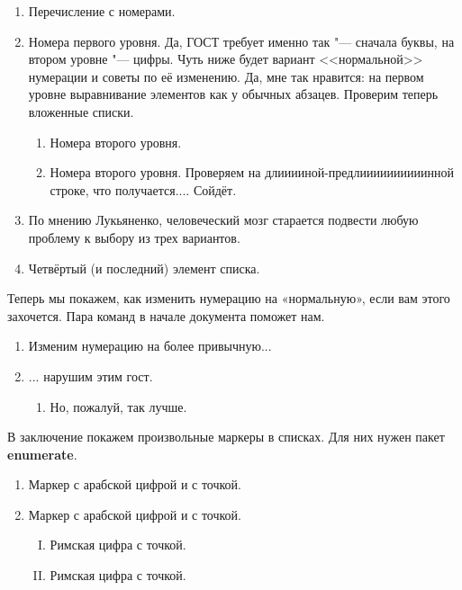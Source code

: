 \begin{enumerate}
\item Перечисление с номерами.
\item Номера первого уровня. Да, ГОСТ требует именно так "--- сначала буквы, на втором уровне "--- цифры.
Чуть ниже будет вариант <<нормальной>> нумерации и советы по её изменению.
Да, мне так нравится: на первом уровне выравнивание элементов как у обычных абзацев. Проверим теперь вложенные списки.
\begin{enumerate}
\item Номера второго уровня.
\item Номера второго уровня. Проверяем на длииииной-предлиииииииииинной строке, что получается.... Сойдёт.
\end{enumerate}
\item По мнению Лукьяненко, человеческий мозг старается подвести любую проблему к выбору
  из трех вариантов.
\item Четвёртый (и последний) элемент списка.
\end{enumerate}

Теперь мы покажем, как изменить нумерацию на «нормальную», если вам этого захочется. Пара команд в начале документа поможет нам.

\renewcommand{\labelenumi}{\arabic{enumi})}
\renewcommand{\labelenumii}{\asbuk{enumii})}

\begin{enumerate}
\item Изменим нумерацию на более привычную...
\item ... нарушим этим гост.
\begin{enumerate}
\item Но, пожалуй, так лучше.
\end{enumerate}
\end{enumerate}

В заключение покажем произвольные маркеры в списках. Для них нужен пакет \textbf{enumerate}.
\begin{enumerate}[1.]
\item Маркер с арабской цифрой и с точкой.
\item Маркер с арабской цифрой и с точкой.
\begin{enumerate}[I.]
\item Римская цифра с точкой.
\item Римская цифра с точкой.
\end{enumerate}
\end{enumerate}

